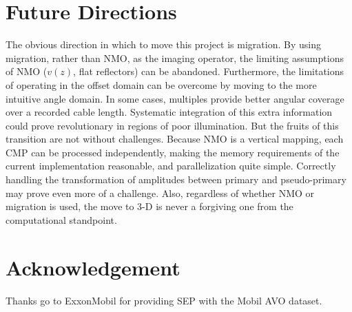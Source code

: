 \section{Future Directions}
The obvious direction in which to move this project is migration.  By using migration, rather than NMO, as
the imaging operator, the limiting assumptions of NMO ($v(z)$, flat reflectors) can be abandoned.  
Furthermore, the limitations of operating in the offset domain can be overcome by moving to the more
intuitive angle domain.  In some cases, multiples provide better angular coverage over a recorded cable
length.  Systematic integration of this extra information could prove revolutionary in regions of poor
illumination.  But the fruits of this transition are not without challenges.  Because NMO is a vertical mapping,
each CMP can be processed independently, making the memory requirements of the current implementation 
reasonable, and parallelization quite simple.  Correctly handling the transformation of amplitudes between
primary and pseudo-primary may prove even more of a challenge.  Also, regardless of whether NMO or migration
is used, the move to 3-D is never a forgiving one from the computational standpoint. 

\section{Acknowledgement}
Thanks go to ExxonMobil for providing SEP with the Mobil AVO dataset.



